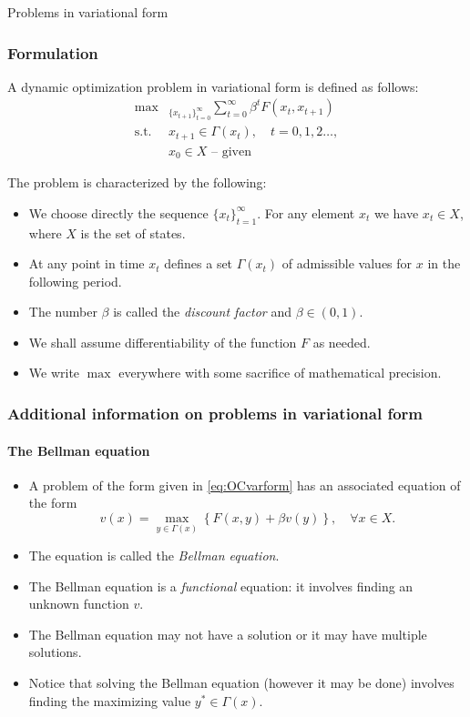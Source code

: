 \documentclass[10pt]{beamer}
\theoremstyle{definition}
\begin{document}
\begin{section}{Problems in variational form}\label{sec:varprob}

\begin{frame}[fragile]
\frametitle{Formulation}
A dynamic optimization problem in variational form is defined as follows:
\begin{equation}\label{eq:OCvarform} 
\begin{split}
 \max&_{\{x_{t+1}\}_{t=0}^\infty} \sum_{t=0}^{\infty}\beta^t F(x_t,x_{t+1})\\
\text{s.t. } & x_{t+1}\in \Gamma(x_t),\quad t=0,1,2\ldots, \\
& x_0\in X \text{ -- given}
\end{split}
\end{equation}

The problem is characterized by the following:
\begin{itemize}
\item We choose directly the sequence $ \{x_t\}_{t=1}^\infty $. For any element $ x_t $ we have $ x_t\in X $, where $ X $ is the set of states.
\item At any point in time $ x_t $ defines a set $ \Gamma(x_t) $ of admissible values for $ x $ in the following period. 
\item The number $ \beta $ is called  the \emph{discount factor} and $ \beta \in (0,1) $.
\item We shall assume differentiability of the function $ F $ as needed.
\item We write $ \max $ everywhere with some sacrifice of mathematical precision.
\end{itemize}
\end{frame}

\begin{frame}[fragile]
\frametitle{Additional information on problems in variational form}
\framesubtitle{The Bellman equation}
\begin{itemize}\itemsep1em
\item A problem of the form given in \eqref{eq:OCvarform} has an associated equation of the form \begin{equation}\label{eq:BellmanVarOC}
v(x) = \max_{y\in \Gamma(x)}\left \{ F(x,y)+\beta v(y)  \right \},\quad \forall x \in X.
\end{equation}
\item  The equation is called the \emph{Bellman equation}.
\item  The Bellman equation is a \emph{functional} equation: it involves finding an unknown function $ v $.
\item The Bellman equation may not have a solution or it may have multiple solutions.
\item Notice that solving the Bellman equation (however it may be done) involves finding the maximizing value $ y^*\in \Gamma(x) $.
\end{itemize}
\end{frame}


\end{section}
\end{document}
